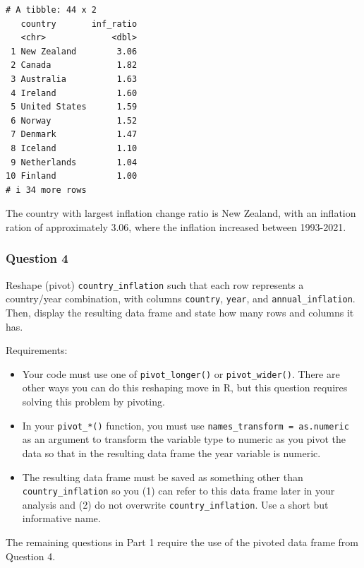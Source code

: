 \documentclass[
  letterpaper,
  DIV=11,
  numbers=noendperiod]{scrartcl}
\providecommand{\tightlist}{%
  \setlength{\itemsep}{0pt}\setlength{\parskip}{0pt}}
\begin{document}
\begin{verbatim}
# A tibble: 44 x 2
   country       inf_ratio
   <chr>             <dbl>
 1 New Zealand        3.06
 2 Canada             1.82
 3 Australia          1.63
 4 Ireland            1.60
 5 United States      1.59
 6 Norway             1.52
 7 Denmark            1.47
 8 Iceland            1.10
 9 Netherlands        1.04
10 Finland            1.00
# i 34 more rows
\end{verbatim}

The country with largest inflation change ratio is New Zealand, with an
inflation ration of approximately 3.06, where the inflation increased
between 1993-2021.

\subsubsection{Question 4}\label{question-4}

Reshape (pivot) \texttt{country\_inflation} such that each row
represents a country/year combination, with columns \texttt{country},
\texttt{year}, and \texttt{annual\_inflation}. Then, display the
resulting data frame and state how many rows and columns it has.

Requirements:

\begin{itemize}
\tightlist
\item
  Your code must use one of \texttt{pivot\_longer()} or
  \texttt{pivot\_wider()}. There are other ways you can do this
  reshaping move in R, but this question requires solving this problem
  by pivoting.
\item
  In your \texttt{pivot\_*()} function, you must use
  \texttt{names\_transform\ =\ as.numeric} as an argument to transform
  the variable type to numeric as you pivot the data so that in the
  resulting data frame the year variable is numeric.
\item
  The resulting data frame must be saved as something other than
  \texttt{country\_inflation} so you (1) can refer to this data frame
  later in your analysis and (2) do not overwrite
  \texttt{country\_inflation}. Use a short but informative name.
\end{itemize}

\begin{tcolorbox}[enhanced jigsaw, toptitle=1mm, bottomrule=.15mm, colbacktitle=quarto-callout-important-color!10!white, colframe=quarto-callout-important-color-frame, leftrule=.75mm, breakable, toprule=.15mm, colback=white, arc=.35mm, coltitle=black, left=2mm, opacitybacktitle=0.6, bottomtitle=1mm, opacityback=0, title=\textcolor{quarto-callout-important-color}{\faExclamation}\hspace{0.5em}{Important}, titlerule=0mm, rightrule=.15mm]

The remaining questions in Part 1 require the use of the pivoted data
frame from Question 4.

\end{tcolorbox}
\end{document}
